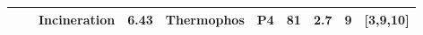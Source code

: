 \documentclass[authoryear]{elsarticle}
\begin{document}
\begin{table}
{\begin{threeparttable}
\begin{tabular}{@{}cccccccccc@{}}
				&                                                                                                                                                         & Incineration                                                                     & 6.43                                      & Thermophos                                                                               & P4                                                                                & 81                                                                                    & 2.7                                  & 9                                                            &     [3,9,10]     \\ 
				\bottomrule
			\end{tabular}

\end{threeparttable}}
\end{table}
\end{document}
